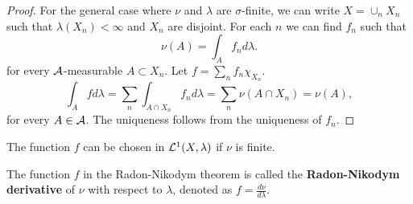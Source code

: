 \begin{proof}
    For the general case where $\nu$ and $\lambda$ are $\sigma$-finite, 
    we can write $X = \cup_n X_n$ such that $\lambda(X_n)<\infty$ 
    and $X_n$ are disjoint. For each $n$ we can find $f_n$ such that 
    \begin{equation*}
        \nu(A) = \int_{A} f_nd\lambda.
    \end{equation*}
    for every $\mathcal{A}$-measurable $A\subset X_n$. Let $f = \sum_n f_n\chi_{X_n}$. 
    \begin{equation*}
        \int_A fd\lambda = \sum_n \int_{A\cap X_n} f_nd\lambda 
        = \sum_n \nu(A\cap X_n) = \nu(A),
    \end{equation*}
    for every $A\in\mathcal{A}$. The uniqueness follows from the uniqueness 
    of $f_n$.
\end{proof}
\begin{remark}
    The function $f$ can be chosen in $\mathcal{L}^1(X,\lambda)$ if 
    $\nu$ is finite.
\end{remark}

\begin{definition}
    The function $f$ in the Radon-Nikodym theorem is called the 
    \textbf{Radon-Nikodym derivative} of $\nu$ with respect to $\lambda$, 
    denoted as $f = \frac{d\nu}{d\lambda}$.
\end{definition}

